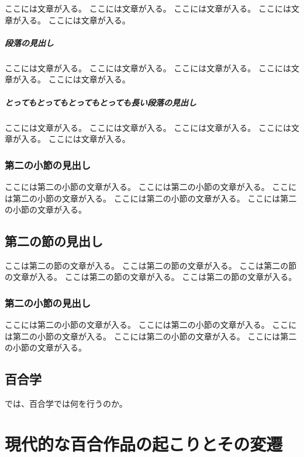 \documentclass[ %
	uplatex,%
	a5paper,%
	papersize%
	]{jsbook}
\begin{document}
	ここには文章が入る。
	ここには文章が入る。
	ここには文章が入る。
	ここには文章が入る。
	ここには文章が入る。


	\paragraph{段落の見出し}

	ここには文章が入る。
	ここには文章が入る。
	ここには文章が入る。
	ここには文章が入る。
	ここには文章が入る。

	\paragraph{とってもとってもとってもとっても長い段落の見出し}

	ここには文章が入る。
	ここには文章が入る。
	ここには文章が入る。
	ここには文章が入る。
	ここには文章が入る。

	\subsection{第二の小節の見出し}

	ここには第二の小節の文章が入る。
	ここには第二の小節の文章が入る。
	ここには第二の小節の文章が入る。
	ここには第二の小節の文章が入る。
	ここには第二の小節の文章が入る。

	\section{第二の節の見出し}

	ここは第二の節の文章が入る。
	ここは第二の節の文章が入る。
	ここは第二の節の文章が入る。
	ここは第二の節の文章が入る。
	ここは第二の節の文章が入る。

	\subsection{第二の小節の見出し}

	ここには第二の小節の文章が入る。
	ここには第二の小節の文章が入る。
	ここには第二の小節の文章が入る。
	ここには第二の小節の文章が入る。
	ここには第二の小節の文章が入る。
	
	\section{百合学}
	では、百合学では何を行うのか。


	\chapter{現代的な百合作品の起こりとその変遷}
\end{document}
